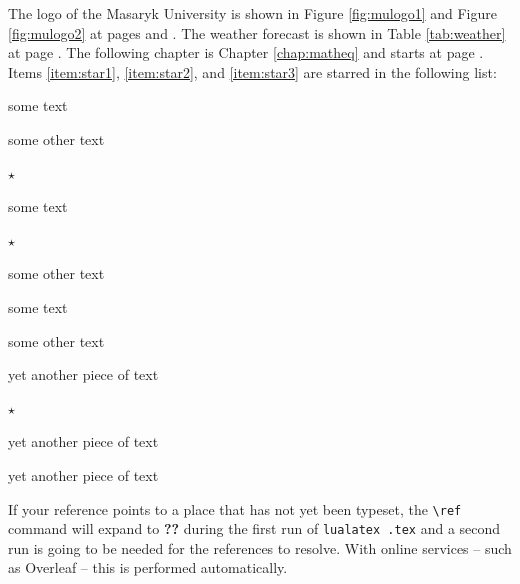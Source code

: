\documentclass[
  digital,     %
  oneside,     %
  nosansbold,  %
  nocolorbold, %
  lof,         %
  lot,         %
]{fithesis4}
\begin{document}
The logo of the Masaryk University is shown in Figure \ref{fig:mulogo1} and
Figure \ref{fig:mulogo2} at pages \pageref{fig:mulogo1} and
\pageref{fig:mulogo2}. The weather forecast is shown in Table
\ref{tab:weather} at page \pageref{tab:weather}. The following
chapter is Chapter \ref{chap:matheq} and starts at page
\pageref{chap:matheq}.  Items \ref{item:star1}, \ref{item:star2},
and \ref{item:star3} are starred in the following list:
\begin{compactenum}
  \item some text
  \item some other text
  \item $\star$ \label{item:star1}
  \begin{compactenum}
    \item some text
    \item $\star$ \label{item:star2}
    \item some other text
    \begin{compactenum}
      \item some text
      \item some other text
      \item yet another piece of text
      \item $\star$ \label{item:star3}
    \end{compactenum}
    \item yet another piece of text
  \end{compactenum}
  \item yet another piece of text
\end{compactenum}
If your reference points to a place that has not yet been typeset,
the \verb"\ref" command will expand to \textbf{??} during the first
run of
\texttt{lualatex \jobname.tex}
and a second run is going to be needed for the references to
resolve. With online services -- such as Overleaf -- this is
performed automatically.
\end{document}
